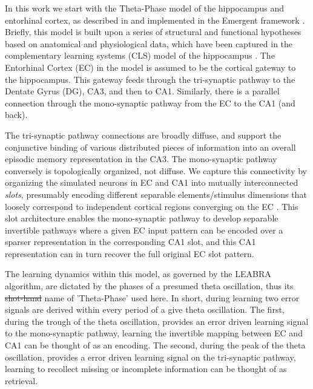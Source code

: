 \documentclass[11pt, titlepage, twoside]{article}
\providecommand{\DIFadd}[1]{{\protect\color{blue}\uwave{#1}}} %
\providecommand{\DIFdel}[1]{{\protect\color{red}\sout{#1}}}                      %
\providecommand{\DIFaddbegin}{} %
\providecommand{\DIFaddend}{} %
\providecommand{\DIFdelbegin}{} %
\providecommand{\DIFdelend}{} %
\begin{document}
In this work we start with the Theta-Phase model of the hippocampus and entorhinal cortex, as described in \textcite{KetzMorkondaOReilly13} and implemented in the Emergent framework \cite{AisaMingusOReilly08} \DIFaddbegin \DIFadd{(see Figure \ref{fig:depNet})}\DIFaddend .  Briefly, this model is built upon a series of structural and functional hypotheses based on anatomical and physiological data, which have been captured in the complementary learning systems (CLS) model of the hippocampus \cite{McClellandMcNaughtonOReilly95, NormanOReilly03}. The Entorhinal Cortex (EC) in the model is assumed to be the cortical gateway to the hippocampus.  This gateway feeds through the tri-synaptic pathway to the Dentate Gyrus (DG), CA3, and then to CA1.  Similarly, there is a parallel connection through the mono-synaptic pathway from the EC to the CA1 (and back).

The tri-synaptic pathway connections are broadly diffuse, and support the conjunctive binding of various distributed pieces of information into an overall episodic memory representation in the CA3. The mono-synaptic pathway conversely is topologically organized, not diffuse.  We capture this connectivity by organizing the simulated neurons in EC and CA1 into mutually interconnected {\em slots}, presumably encoding different separable elements/stimulus dimensions that loosely correspond to independent cortical regions converging on the EC \cite{Witter10}.  This slot architecture enables the mono-synaptic pathway to develop separable invertible pathways where a given EC input pattern can be encoded over a sparser representation in the corresponding CA1 slot, and this CA1 representation can in turn recover the full original EC slot pattern. 

The learning dynamics within this model, as governed by the LEABRA algorithm, are dictated by the phases of a presumed theta oscillation, thus its \DIFdelbegin \DIFdel{shot-hand }\DIFdelend \DIFaddbegin \DIFadd{short-hand }\DIFaddend name of 'Theta-Phase' used here. In short, during learning two error signals are derived within every period of a give theta oscillation.  The first, during the trough of the theta oscillation, provides an error driven learning signal to the mono-synaptic pathway, learning the invertible mapping between EC and CA1 can be thought of as an encoding.  The second, during the peak of the theta oscillation, provides a error driven learning signal on the tri-synaptic pathway, learning to recollect missing or incomplete information can be thought of as retrieval.  
\end{document}
